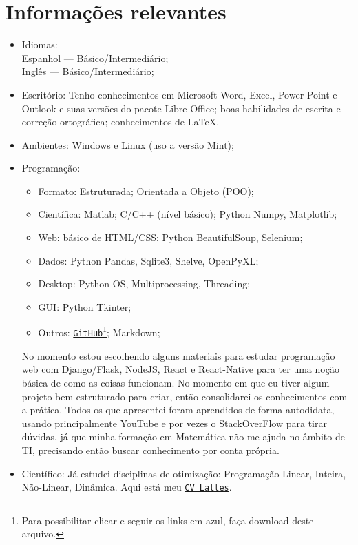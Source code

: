 \documentclass[11pt]{article}
\begin{document}
\section{Informações relevantes \dotfill}
\begin{itemize}
\item Idiomas: \\Espanhol --- Básico/Intermediário;\\ Inglês --- Básico/Intermediário;

\item Escritório: Tenho conhecimentos em Microsoft Word, Excel, Power Point e Outlook e suas versões do pacote Libre Office; boas habilidades de escrita e correção ortográfica; conhecimentos de LaTeX.

\item Ambientes: Windows e Linux (uso a versão Mint);

\item Programação:
\begin{itemize}
\item Formato: Estruturada; Orientada a Objeto (POO);
\item Científica: Matlab; C/C++ (nível básico); Python Numpy, Matplotlib;
\item Web: básico de HTML/CSS; Python BeautifulSoup, Selenium;
\item Dados: Python Pandas, Sqlite3, Shelve, OpenPyXL;
\item Desktop: Python OS, Multiprocessing, Threading;
\item GUI: Python Tkinter;
\item Outros: \href{https://github.com/j5r}{\texttt{GitHub}}\footnote{Para possibilitar clicar e seguir os links em azul, faça download deste arquivo.}; Markdown;
\end{itemize}
No momento estou escolhendo alguns materiais para estudar programação web com Django/Flask, NodeJS, React e React-Native para ter uma noção básica de como as coisas funcionam.  No momento em que eu tiver algum projeto bem estruturado para criar, então consolidarei os conhecimentos com a prática. Todos os que apresentei foram aprendidos de forma autodidata, usando principalmente YouTube e por vezes o StackOverFlow para tirar dúvidas, já que minha formação em Matemática não me ajuda no âmbito de TI, precisando então buscar conhecimento por conta própria.

\item Científico: Já estudei disciplinas de otimização: Programação Linear, Inteira, Não-Linear, Dinâmica. 
Aqui está meu \href{http://lattes.cnpq.br/3866983332299702}{\texttt{CV Lattes}}.


\end{itemize}
\end{document}
